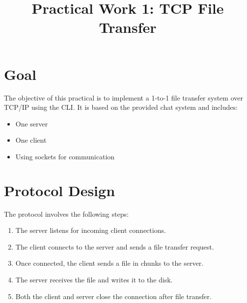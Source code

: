 \documentclass[a4paper,12pt]{article}
\title{Practical Work 1: TCP File Transfer}
\author{}
\date{}
\begin{document}
\maketitle

\section*{Goal}
The objective of this practical is to implement a 1-to-1 file transfer system over TCP/IP using the CLI. It is based on the provided chat system and includes:
\begin{itemize}
    \item One server
    \item One client
    \item Using sockets for communication
\end{itemize}

\section*{Protocol Design}
The protocol involves the following steps:
\begin{enumerate}
    \item The server listens for incoming client connections.
    \item The client connects to the server and sends a file transfer request.
    \item Once connected, the client sends a file in chunks to the server.
    \item The server receives the file and writes it to the disk.
    \item Both the client and server close the connection after file transfer.
\end{enumerate}
\end{document}
